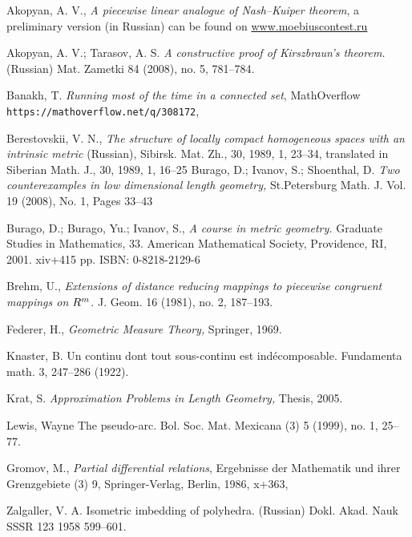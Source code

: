 \documentclass[oneside,a4paper]{article}
\begin{document}
\begin{thebibliography}{52} 
 Akopyan, A. V.,
\textit{A piecewise linear analogue of Nash--Kuiper theorem},
a preliminary version (in Russian) can be found on
\href{http://www.moebiuscontest.ru/files/2007/akopyan.pdf}{www.moebiuscontest.ru}

 Akopyan, A. V.; Tarasov, A. S.
\textit{A constructive proof of Kirszbraun's theorem.} 
(Russian) Mat. Zametki 84 (2008), no. 5, 781--784. 

 Banakh, T. \textit{Running most of the time in a connected set},  MathOverflow   \texttt{https://mathoverflow.net/q/308172},

 Berestovskii, V. N.,
   \textit{The structure of locally compact homogeneous spaces with an
   intrinsic metric} (Russian),
   {Sibirsk. Mat. Zh.},
   {30},
   {1989},
   {1},
   {23--34},
   translated in
   {Siberian Math. J.},
      {30},
      {1989},
      {1},
    {16--25}
 Burago, D.; Ivanov, S.; Shoenthal, D.   \textit{Two counterexamples in low dimensional length geometry,}
St.Petersburg Math. J. Vol. 19 (2008), No. 1, Pages 33--43

 Burago, D.; Burago, Yu.; Ivanov, S., \textit{A course in metric geometry.} Graduate Studies in Mathematics, 33. American Mathematical Society, Providence, RI, 2001. xiv+415 pp. ISBN: 0-8218-2129-6

 Brehm, U., \textit{Extensions of distance reducing mappings to piecewise congruent mappings on $R\sp{m}$.}  J. Geom.  16  (1981), no. 2, 187--193.

 Federer, H., \textit{Geometric Measure Theory,} Springer, 1969.

 Knaster, B. Un continu dont tout sous-continu est ind\'ecomposable. Fundamenta math. 3, 247--286 (1922).

 Krat, S. \textit{Approximation Problems in Length Geometry,} Thesis, 2005.

Lewis, Wayne The pseudo-arc. Bol. Soc. Mat. Mexicana (3) 5 (1999), no. 1, 25--77.


  Gromov, M.,
\textit{Partial differential relations},
 Ergebnisse der Mathematik und ihrer Grenzgebiete (3) 
{9},
{Springer-Verlag},
 {Berlin},
 {1986},
 {x+363},

 Zalgaller, V. A. Isometric imbedding of polyhedra. (Russian)  Dokl. Akad. Nauk SSSR  123  1958 599--601.

\end{thebibliography}
\end{document}

